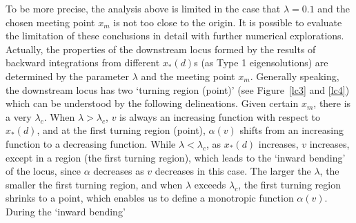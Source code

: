 \documentclass[fleqn,usenatbib]{mnras}
\begin{document}
To be more precise, the analysis above is limited in the case that $\lambda=0.1$ and the chosen meeting point $x_{m}$ is not too close to the origin. It is possible to evaluate the limitation of these conclusions in detail with further numerical explorations. Actually, the properties of the downstream locus formed by the results of backward integrations from different $x_{*}(d)$s (as Type 1 eigensolutions) are determined by the parameter $\lambda$ and the meeting point $x_{m}$. Generally speaking, the downstream locus has two `turning region (point)' (see Figure~\ref{lc3} and \ref{lc4}) which can be understood by the following delineations. Given certain $x_{m}$, there is a very $\lambda_{c}$. When $\lambda>\lambda_{c}$, $v$ is always an increasing function with respect to $x_{*}(d)$, and at the first turning region (point), $\alpha(v)$ shifts from an increasing function to a decreasing function. While $\lambda<\lambda_{c}$, as $x_{*}(d)$ increases, $v$ increases, except in a region (the first turning region), which leads to the `inward bending' of the locus, since $\alpha$ decreases as $v$ decreases in this case. The larger the $\lambda$, the smaller the first turning region, and when $\lambda$ exceeds $\lambda_{c}$, the first turning region shrinks to a point, which enables us to define a monotropic function $\alpha(v)$. During the `inward bending'
\end{document}
